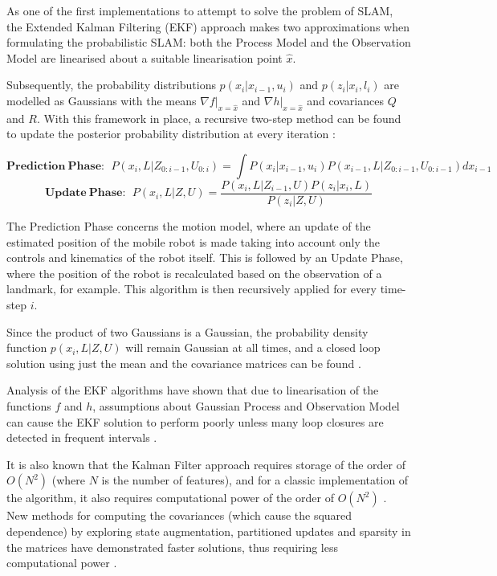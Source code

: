 \documentclass[12pt]{article}
\begin{document}
As one of the first implementations to attempt to solve the problem of SLAM, the Extended Kalman Filtering (EKF) approach makes two approximations when formulating the probabilistic SLAM: both the Process Model and the Observation Model are linearised about a suitable linearisation point $\hat{x}$.

 Subsequently, the probability distributions $p(x_i|x_{i-1}, u_i)$ and $p(z_i|x_i, l_i)$ are modelled as Gaussians with the means $\nabla f|_{x=\hat{x}}$ and $\nabla h|_{x=\hat{x}}$ and covariances $Q$ and $R$. With this framework in place, a recursive two-step method can be found to update the posterior probability distribution at every iteration \cite{SLAMPartI}:

\begin{equation*}
\mathbf{Prediction\ Phase:}\ \ 
P(x_{i},L|Z_{0:i-1}, U_{0:i}) = \int P(x_i | x_{i-1}, u_{i}) P(x_{i-1}, L |Z_{0:i-1}, U_{0:i-1})dx_{i-1}
\end{equation*}
\begin{equation*}
\mathbf{Update\ Phase:} \ \  P(x_i, L | Z, U) = \frac{P(x_{i}, L | Z_{i-1}, U)P(z_i|x_i,L)}{P(z_i|Z, U)}
\end{equation*}	 	

The Prediction Phase concerns the motion model, where an update of the estimated position of the mobile robot is made taking into account only the controls and kinematics of the robot itself. This is followed by an Update Phase, where the position of the robot is recalculated based on the observation of a landmark, for example. This algorithm is then recursively applied for every time-step $i$. 	

Since the product of two Gaussians is a Gaussian, the probability density function $p(x_i, L|Z, U)$ will remain Gaussian at all times, and a closed loop solution using just the mean and the covariance matrices can be found \cite{772544}.

Analysis of the EKF algorithms have shown that due to linearisation of the functions $f$ and $h$, assumptions about Gaussian Process and Observation Model can cause the EKF solution to perform poorly unless many loop closures are detected in frequent intervals \cite{doi:10.1177/1729881416669482}.

It is also known that the Kalman Filter approach requires storage of the order of $O(N^2)$ (where $N$ is the number of features), and for a classic implementation of the algorithm, it also requires computational power of the order of $O(N^2)$ \cite{CsorbaThesis}. New methods for computing the covariances (which cause the squared dependence) by exploring state augmentation, partitioned updates and sparsity in the matrices have demonstrated faster solutions, thus requiring less computational power \cite{SLAMPartII}.
\end{document}
